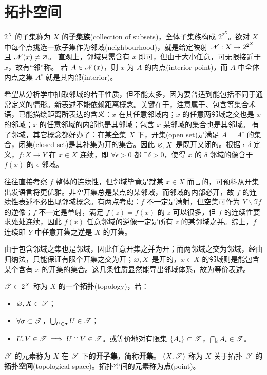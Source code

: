 \section{拓扑空间}

$2^X$ 的子集称为 $X$ 的\textbf{子集族}(collection of subsets)，全体子集族构成 $2^{2^X}$。欲对 $X$ 中每个点挑选⼀族⼦集作为邻域(neighbourhood)，就是给定映射 $\mathscr N:X\to 2^{2^X}$ 且 $\mathscr N(x)\ne \varnothing$。
直观上，邻域只需含有 $x$ 即可，但由于大小任意，可无限接近于 $x$，故有“邻”称。
若 $A\in \mathscr N(x)$，则 $x$ 为 $A$ 的内点(interior point)，而 $A$ 中全体内点之集 $A^\circ$ 就是其内部(interior)。

希望从分析学中抽取邻域的若干性质，但不能太多，因为要普适到能包括不同于通常定义的情形。新表述不能依赖距离概念。关键在于，注意属于、包含等集合术语，已能描绘距离所表达的含义：$x$ 在其任意邻域内；$x$ 的任意两邻域之交也是 $x$ 的邻域；$x$ 的任意邻域的内部也是其邻域；包含 $x$ 某邻域的集合也是其邻域。
有了邻域，其它概念都好办了：在某全集 $X$ 下，开集(open set)是满足 $A=A^\circ$ 的集合，闭集(closed set)是其补集为开的集合。因此 $\varnothing,X$ 是既开又闭的。根据 $\epsilon$-$\delta$ 定义，$f:X\to Y$ 在 $x\in X$ 连续，即 $\forall\epsilon>0$ 都 $\exists\delta>0$，使得 $x$ 的 $\delta$ 邻域的像含于 $f(x)$ 的 $\epsilon$ 邻域。

往往直接考察 $f$ 整体的连续性，但邻域毕竟是就某 $x\in X$ 而言的，可预料从开集出发语言将更优雅。非空开集总是某点的某邻域，而邻域的内部必开，故 $f$ 的连续性表述不必出现邻域概念。有两点考虑：$f$ 不一定是满射，但空集可作为 $Y\backslash\Im f$ 的逆像；$f$ 不一定是单射，满足 $f(z)=f(x)$ 的 $z$ 可以很多，但 $f$ 的连续性要求处处连续，因此 $f(x)$ 任意邻域的逆像一定是所有 $z$ 的某邻域之并。综上，$f$ 连续即 $Y$ 中任意开集之逆是 $X$ 的开集。

由于包含邻域之集也是邻域，因此任意开集之并为开；而两邻域之交为邻域，经由归纳法，只能保证有限个开集之交为开；$\varnothing,X$ 是开的，$x\in X$ 的邻域则是能包含某个含有 $x$ 的开集的集合。这几条性质显然能导出邻域体系，故为等价表述。

\begin{definition}
$\mathscr{T}\subset 2^X$ 称为 $X$ 的一个\textbf{拓扑}(topology)，若：
\begin{itemize}
    \item $\varnothing,X \in \mathscr{T}$；
    \item $\forall \sigma\subset \mathscr{T}$，$\bigcup_{U\in\sigma} U\in \mathscr{T}$；
    \item $U,V\in\mathscr{T}\implies U\cap V\in\mathscr{T}$。或等价地对有限集 $\{A_{i}\} \subset \mathscr{T}$，$\bigcap_{i} A_{i} \in \mathscr{T}$。
\end{itemize}
$\mathscr{T}$ 的元素称为 $X$ 在 $\mathscr{T}$ 下的\textbf{开子集}，简称\textbf{开集}。
$(X,\mathscr T)$ 称为 $X$ 关于拓扑 $\mathscr T$ 的\textbf{拓扑空间}(topological space)。拓扑空间的元素称为\textbf{点}(point)。
\end{definition}

